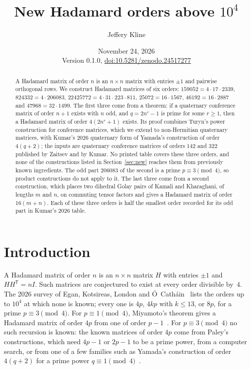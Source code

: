 \documentclass[10pt]{article}
\title{New Hadamard orders above $10^4$}
\author{Jeffery Kline}
\date{November 24, 2026\\[3pt]\small Version 0.1.0, \href{https://doi.org/10.5281/zenodo.24517277}{doi:10.5281/zenodo.24517277}}
\theoremstyle{remark}
\newcommand{\tr}{^{\mathsf T}}
\begin{document}
\maketitle

\begin{abstract}
A Hadamard matrix of order $n$ is an $n\times n$ matrix with entries $\pm1$ and pairwise orthogonal rows. We construct Hadamard matrices of six orders: $159052=4\cdot17\cdot2339$, $824332=4\cdot206083$, $22425772=4\cdot31\cdot223\cdot811$, $25072=16\cdot1567$, $46192=16\cdot2887$ and $47968=32\cdot1499$. The first three come from a theorem: if a quaternary conference matrix of order $n+1$ exists with $n$ odd, and $q=2n^r-1$ is prime for some $r\ge1$, then a Hadamard matrix of order $4(2n^r+1)$ exists. Its proof combines Turyn's power construction for conference matrices, which we extend to non-Hermitian quaternary matrices, with Kumar's 2026 quaternary form of Yamada's construction of order $4(q+2)$; the inputs are quaternary conference matrices of orders $142$ and $322$ published by Zaitsev and by Kumar. No printed table covers these three orders, and none of the constructions listed in Section~\ref{sec:new} reaches them from previously known ingredients. The odd part $206083$ of the second is a prime $p\equiv3\pmod 4$, so product constructions do not apply to it. The last three come from a second construction, which places two dihedral Golay pairs of Kamali and Kharaghani, of lengths $m$ and $n$, on commuting tensor factors and gives a Hadamard matrix of order $16(m+n)$. Each of these three orders is half the smallest order recorded for its odd part in Kumar's 2026 table.
\end{abstract}

\section{Introduction}\label{sec:intro}
A Hadamard matrix of order $n$ is an $n\times n$ matrix $H$ with entries $\pm1$ and $HH\tr=nI$. Such matrices are conjectured to exist at every order divisible by~$4$. The 2026 survey of Egan, Kotsireas, London and \'O~Cath\'ain~\cite{EKLO} lists the orders up to $10^4$ at which none is known; every one is $4p$, $4kp$ with $k\le13$, or $8p$, for a prime $p\equiv3\pmod4$. For $p\equiv1\pmod4$, Miyamoto's theorem gives a Hadamard matrix of order $4p$ from one of order $p-1$~\cite{Mi91}. For $p\equiv3\pmod4$ no such recursion is known: the known matrices of order $4p$ come from Paley's constructions, which need $4p-1$ or $2p-1$ to be a prime power, from a computer search, or from one of a few families such as Yamada's construction of order $4(q+2)$ for a prime power $q\equiv1\pmod4$~\cite{Ya89}.
\end{document}
